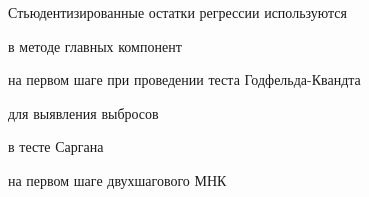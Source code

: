 
\begin{question}
Стьюдентизированные остатки регрессии используются
\begin{answerlist}
  \item в методе главных компонент
  \item на первом шаге при проведении теста Годфельда-Квандта
  \item для выявления выбросов
  \item в тесте Саргана
  \item на первом шаге двухшагового МНК
\end{answerlist}
\end{question}


